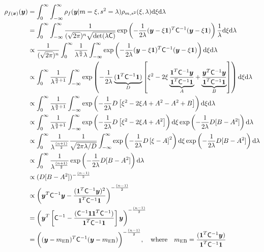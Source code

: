 \documentclass{iitthesis}          %
\newcommand{\bm}[1]{\boldsymbol{#1}}
\newcommand{\dif}[1]{\text{d}{#1}}
\newcommand{\vx}{\bm{x}}
\newcommand{\vy}{\bm{y}}
\newcommand{\vone}{\bm{1}}
\newcommand{\mC}{\mathsf{C}}
\newcommand{\mCInv}{{\mathsf{C}^{-1}}}
\newcommand{\MLE}{\textup{EB}}
\begin{document}
{{{{{{\begin{align*}
\rho_{f(\vx)}(\vy) &=\int_{0}^\infty \int_{-\infty}^\infty \rho_{f} (\vy | m=\xi, s^2=\lambda) 
\rho_{m,s^2} (\xi, \lambda) \dif{\xi} \dif{\lambda} 
\\
&= \int_{0}^\infty \int_{-\infty}^\infty \frac{1}{(\sqrt{2 \pi})^n \sqrt{\det(\lambda \mC)}} 
\exp \left( -\frac{1}{2\lambda} (\vy - \xi \vone)^T\mCInv (\vy- \xi\vone)\right) \frac{1}{\lambda} \dif{\xi} \dif{\lambda}
\\
& \propto \frac{1}{(\sqrt{2 \pi})^n} \int_{0}^\infty \frac{1}{\lambda ^{\frac n2} \lambda}
\int_{-\infty}^\infty \exp \left( -\frac{1}{2\lambda} (\vy - \xi \vone)^T\mCInv (\vy- \xi\vone)\right)  \dif{\xi} \dif{\lambda}
\\
& \propto \int_{0}^\infty \frac{1}{\lambda^{\frac n2 + 1}}
\int_{-\infty}^\infty \exp \left( -\frac{1}{2\lambda} 
\underbrace{(\vone^T \mCInv \vone)}_{D}
\left[
\xi^2 -2 \xi \underbrace{\frac{\vone^T \mCInv \vy }{\vone^T \mCInv \vone}}_{A} + \underbrace{\frac{\vy^T \mCInv \vy }{\vone^T \mCInv \vone}}_{B} 
\right]
\right)  \dif{\xi} \dif{\lambda}
\\
& \propto \int_{0}^\infty \frac{1}{\lambda^{\frac n2 + 1}}
\int_{-\infty}^\infty \exp \left( -\frac{1}{2\lambda} D
\left[
\xi^2 -2 \xi A + A^2 - A^2 + B
\right]
\right)  \dif{\xi} \dif{\lambda}
\\
& \propto \int_{0}^\infty \frac{1}{\lambda^{\frac n2 + 1}}
\int_{-\infty}^\infty \exp \left( -\frac{1}{2\lambda} D
\left[
\xi^2 -2 \xi A + A^2
\right]
\right) \dif{\xi}
\exp \left(  - \frac{1}{2\lambda} D [B - A^2] \right)
\dif{\lambda}
\\
& \propto \int_{0}^\infty \frac{1}{\lambda^{\frac{(n+1)}{2}}}
\frac{1}{\sqrt{2\pi\lambda/D}}
\int_{-\infty}^\infty \exp \left( -\frac{1}{2\lambda} D
\left[
\xi-A
\right]^2
\right) \dif{\xi}
\exp \left(  - \frac{1}{2\lambda} D [B - A^2] \right)
\dif{\lambda}
\\
& \propto \int_{0}^\infty \frac{1}{\lambda^{\frac{(n+1)}{2}}}
\exp \left(  - \frac{1}{2\lambda} D [B - A^2] \right)
\dif{\lambda}
\\
& \propto (D[B-A^2])^{-\frac{(n-1)}{2}}
\\
& \propto \left(\vy^T\mCInv\vy - \frac{(\vone^T\mCInv\vy)^2}{\vone^T\mCInv\vone} \right)^{-\frac{(n-1)}{2}}
\\
&=  \left(\vy^T \left[\mCInv - \frac{(\mCInv\vone \vone^T \mCInv)}{\vone^T\mCInv\vone} \right]\vy \right)^{-\frac{(n-1)}{2}}
\\
&=  \biggl((\vy-m_\MLE)^T \mCInv (\vy-m_\MLE) \biggr)^{-\frac{(n-1)}{2}}, 
\quad \text{where} \quad
m_\MLE=\frac{(\vone^T \mCInv \vy)}{\vone^T\mCInv\vone}
\end{align*}

}}}}}}
\end{document}
